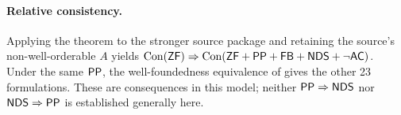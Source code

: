\paragraph{Relative consistency.} Applying the theorem to the stronger source package and retaining the source's non-well-orderable $A$ yields $\operatorname{Con}(\mathsf{ZF})\Rightarrow\operatorname{Con}(\mathsf{ZF}+\mathsf{PP}+\mathsf{FB}+\mathsf{NDS}+\neg\mathsf{AC})$. Under the same $\mathsf{PP}$, the well-foundedness equivalence of \cite[Proposition 9.8]{BK} gives the other 23 formulations. These are consequences in this model; neither $\mathsf{PP}\Rightarrow\mathsf{NDS}$ nor $\mathsf{NDS}\Rightarrow\mathsf{PP}$ is established generally here.
